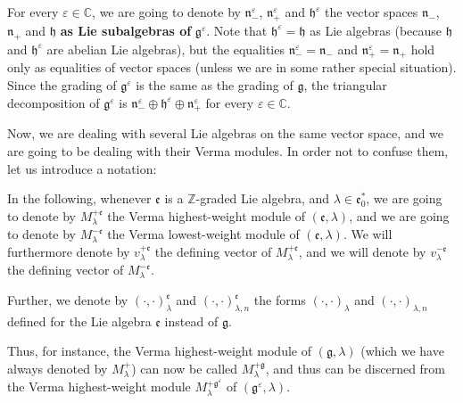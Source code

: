 \documentclass[etingof-lie.tex]{subfiles}
\begin{document}
For every $\varepsilon\in\mathbb{C}$, we are going to denote by $\mathfrak{n}%
_{-}^{\varepsilon}$, $\mathfrak{n}_{+}^{\varepsilon}$ and $\mathfrak{h}%
^{\varepsilon}$ the vector spaces $\mathfrak{n}_{-}$, $\mathfrak{n}_{+}$ and
$\mathfrak{h}$ \textbf{as Lie subalgebras of }$\mathfrak{g}^{\varepsilon}$.
Note that $\mathfrak{h}^{\varepsilon}=\mathfrak{h}$ as Lie algebras (because
$\mathfrak{h}$ and $\mathfrak{h}^{\varepsilon}$ are abelian Lie algebras), but
the equalities $\mathfrak{n}_{-}^{\varepsilon}=\mathfrak{n}_{-}$ and
$\mathfrak{n}_{+}^{\varepsilon}=\mathfrak{n}_{+}$ hold only as equalities of
vector spaces (unless we are in some rather special situation). Since the
grading of $\mathfrak{g}^{\varepsilon}$ is the same as the grading of
$\mathfrak{g}$, the triangular decomposition of $\mathfrak{g}^{\varepsilon}$
is $\mathfrak{n}_{-}^{\varepsilon}\oplus\mathfrak{h}^{\varepsilon}%
\oplus\mathfrak{n}_{+}^{\varepsilon}$ for every $\varepsilon\in\mathbb{C}$.

Now, we are dealing with several Lie algebras on the same vector space, and we
are going to be dealing with their Verma modules. In order not to confuse
them, let us introduce a notation:

\begin{Convention}
In the following, whenever $\mathfrak{e}$ is a $\mathbb{Z}$-graded Lie
algebra, and $\lambda\in\mathfrak{e}_{0}^{\ast}$, we are going to denote by
$M_{\lambda}^{+\mathfrak{e}}$ the Verma highest-weight module of $\left(
\mathfrak{e},\lambda\right)  $, and we are going to denote by $M_{\lambda
}^{-\mathfrak{e}}$ the Verma lowest-weight module of $\left(  \mathfrak{e}%
,\lambda\right)  $. We will furthermore denote by $v_{\lambda}^{+\mathfrak{e}%
}$ the defining vector of $M_{\lambda}^{+\mathfrak{e}}$, and we will denote by
$v_{\lambda}^{-\mathfrak{e}}$ the defining vector of $M_{\lambda
}^{-\mathfrak{e}}$.

Further, we denote by $\left(  \cdot,\cdot\right)  _{\lambda}^{\mathfrak{e}}$
and $\left(  \cdot,\cdot\right)  _{\lambda,n}^{\mathfrak{e}}$ the forms
$\left(  \cdot,\cdot\right)  _{\lambda}$ and $\left(  \cdot,\cdot\right)
_{\lambda,n}$ defined for the Lie algebra $\mathfrak{e}$ instead of
$\mathfrak{g}$.
\end{Convention}

Thus, for instance, the Verma highest-weight module of $\left(  \mathfrak{g}%
,\lambda\right)  $ (which we have always denoted by $M_{\lambda}^{+}$) can now
be called $M_{\lambda}^{+\mathfrak{g}}$, and thus can be discerned from the
Verma highest-weight module $M_{\lambda}^{+\mathfrak{g}^{\varepsilon}}$ of
$\left(  \mathfrak{g}^{\varepsilon},\lambda\right)  $.
\end{document}
